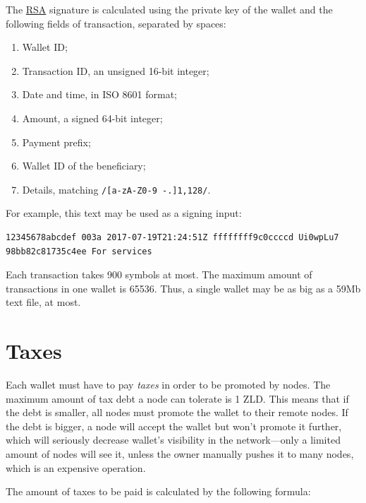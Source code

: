 \documentclass[11pt,oneside]{article}
\newcommand\dd[1]{\colorbox{gray!30}{\texttt{#1}}}
\begin{document}
The \href{https://en.wikipedia.org/wiki/RSA_(cryptosystem)}{RSA}
signature is calculated using the private key of the
wallet and the following fields of transaction, separated by spaces:

\begin{enumerate}
  \item Wallet ID;
  \item Transaction ID, an unsigned 16-bit integer;
  \item Date and time, in ISO 8601 format;
  \item Amount, a signed 64-bit integer;
  \item Payment prefix;
  \item Wallet ID of the beneficiary;
  \item Details, matching \dd{/[a-zA-Z0-9 -.]{1,128}/}.
\end{enumerate}

For example, this text may be used as a signing input:

\begin{verbatim}
12345678abcdef 003a 2017-07-19T21:24:51Z ffffffff9c0ccccd Ui0wpLu7 98bb82c81735c4ee For services
\end{verbatim}

Each transaction takes 900 symbols at most.
The maximum amount of transactions in one wallet is 65536.
Thus, a single wallet may be as big as a 59Mb text file, at most.

\section{Taxes}

Each wallet must have to pay \emph{taxes} in order to be promoted by nodes.
The maximum amount of tax debt a node can tolerate is 1 ZLD. This means
that if the debt is smaller, all nodes must promote the wallet to their
remote nodes. If the debt is bigger, a node will accept the wallet but won't
promote it further, which will seriously decrease wallet's visibility in
the network---only a limited amount of nodes will see it, unless the owner
manually pushes it to many nodes, which is an expensive operation.

The amount of taxes to be paid is calculated by the following formula:
\end{document}
